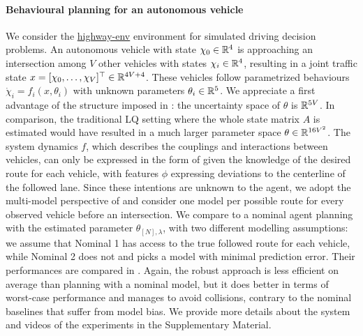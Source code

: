 \paragraph{Behavioural planning for an autonomous vehicle}
We consider the \href{https://github.com/eleurent/highway-env}{highway-env} environment \citep{highway-env} for simulated driving decision problems. An autonomous vehicle with state $\chi_0\in\mathbb{R}^4$ is approaching an intersection among $V$ other vehicles with states $\chi_i\in\mathbb{R}^4$, resulting in a joint traffic state $x = [\chi_0, \dots,\chi_V]^\top\in\mathbb{R}^{4V+4}$. These vehicles follow parametrized behaviours $\dot{\chi}_i=f_i(x,\theta_i)$ with unknown parameters $\theta_i\in\mathbb{R}^5$. We appreciate a first advantage of the structure imposed in : the uncertainty space of $\theta$ is $\mathbb{R}^{5V}$. In comparison, the traditional LQ setting where the whole state matrix $A$ is estimated would have resulted in a much larger parameter space $\theta\in\mathbb{R}^{16V^2}$.
The system dynamics $f$, which describes the couplings and interactions between vehicles, can only be expressed in the form of  given the knowledge of the desired route for each vehicle, with features $\phi$ expressing deviations to the centerline of the followed lane. Since these intentions are unknown to the agent, we adopt the multi-model perspective of  and consider one model per possible route for every observed vehicle before an intersection. We compare  to a nominal agent planning with the estimated parameter $\theta_{[N],\lambda}$, with two different modelling assumptions: we assume that Nominal 1 has access to the true followed route for each vehicle, while Nominal 2 does not and picks a model with minimal prediction error. Their performances are compared in . Again, the robust approach is less efficient on average than planning with a nominal model, but it does better in terms of worst-case performance and manages to avoid collisions, contrary to the nominal baselines that suffer from model bias. We provide more details about the system and videos of the experiments in the Supplementary Material.

